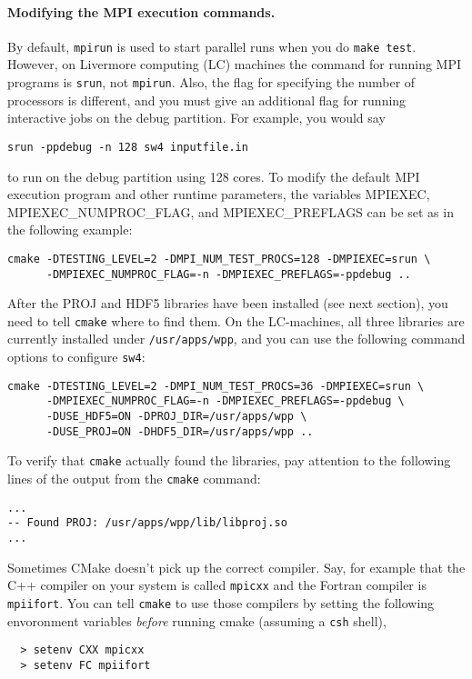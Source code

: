 \documentclass[11pt]{article}
\begin{document}
\paragraph{Modifying the MPI execution commands.}
By default, \verb+mpirun+ is used to start parallel runs when you do \verb+make test+.  However, on
Livermore computing (LC) machines the command for running MPI programs is \verb+srun+, not
\verb+mpirun+. Also, the flag for specifying the number of processors is different, and you must
give an additional flag for running interactive jobs on the debug partition. For example, you would
say
\begin{verbatim}
srun -ppdebug -n 128 sw4 inputfile.in
\end{verbatim}
to run on the debug partition using 128 cores. To modify the default MPI execution program and
other runtime parameters, the variables MPIEXEC, MPIEXEC\_NUMPROC\_FLAG, and
MPIEXEC\_PREFLAGS can be set as in the following example:
\begin{verbatim}
cmake -DTESTING_LEVEL=2 -DMPI_NUM_TEST_PROCS=128 -DMPIEXEC=srun \
      -DMPIEXEC_NUMPROC_FLAG=-n -DMPIEXEC_PREFLAGS=-ppdebug ..
\end{verbatim}

After the PROJ and HDF5 libraries have been installed (see next section), you need to tell
\verb+cmake+ where to find them. On the LC-machines, all three libraries are currently installed under
\verb+/usr/apps/wpp+, and you can use the following command options to configure \verb+sw4+:
\begin{verbatim}
cmake -DTESTING_LEVEL=2 -DMPI_NUM_TEST_PROCS=36 -DMPIEXEC=srun \
      -DMPIEXEC_NUMPROC_FLAG=-n -DMPIEXEC_PREFLAGS=-ppdebug \
      -DUSE_HDF5=ON -DPROJ_DIR=/usr/apps/wpp \
      -DUSE_PROJ=ON -DHDF5_DIR=/usr/apps/wpp ..
\end{verbatim}
To verify that \verb+cmake+ actually found the libraries, pay attention to the
following lines of the output from the \verb+cmake+ command:
\begin{verbatim}
...
-- Found PROJ: /usr/apps/wpp/lib/libproj.so  
...
\end{verbatim}

Sometimes CMake doesn't pick up the correct compiler. Say, for example that the C++ compiler on your
system is called {\tt mpicxx} and the Fortran compiler is {\tt mpiifort}. You can tell {\tt cmake}
to use those compilers by setting the following envoronment variables {\em before} running cmake
(assuming a {\tt csh} shell),
\begin{verbatim}
  > setenv CXX mpicxx
  > setenv FC mpiifort
\end{verbatim}
\end{document}
